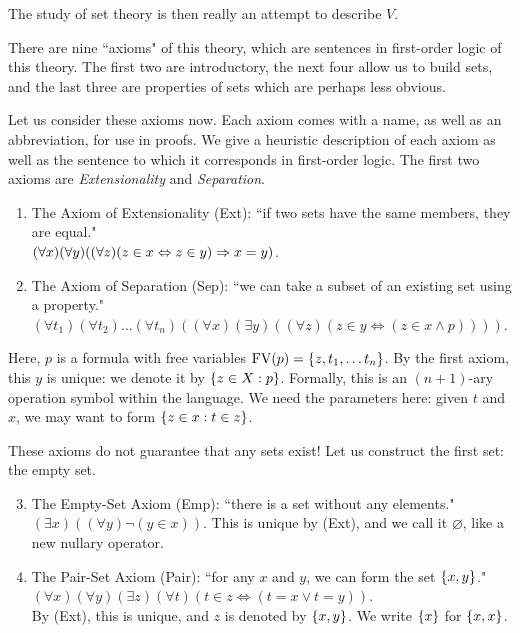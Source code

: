 \documentclass{article}
\begin{document}
The study of set theory is then really an attempt to describe $V$.

There are nine ``axioms" of this theory, which are sentences in first-order logic of this theory. The first two are introductory, the next four allow us to build sets, and the last three are properties of sets which are perhaps less obvious.

Let us consider these axioms now. Each axiom comes with a name, as well as an abbreviation, for use in proofs. We give a heuristic description of each axiom as well as the sentence to which it corresponds in first-order logic. The first two axioms are \textit{Extensionality} and \textit{Separation}.

\begin{enumerate}
    \item The Axiom of Extensionality (Ext): ``if two sets have the same members, they are equal." \\
    $(\forall x)(\forall y)((\forall z)(z \in x \Leftrightarrow z \in y) \Rightarrow x = y)$.
    \item The Axiom of Separation (Sep): ``we can take a subset of an existing set using a property." \\
    $(\forall t_1)(\forall t_2) \dots (\forall t_n)((\forall x)(\exists y)((\forall z)(z \in y \Leftrightarrow (z \in x \land p))))$.
\end{enumerate}

\begin{note}
	Here, $p$ is a formula with free variables $\mathrm{FV}(p) = \left\lbrace z, t_1, \dots t_n \right\rbrace$. By the first axiom, this $y$ is unique: we denote it by $\left\lbrace z \in X : p \right\rbrace$. Formally, this is an $(n+1)$-ary operation symbol within the language. We need the parameters here: given $t$ and $x$, we may want to form $\left\lbrace z \in x: t \in z \right\rbrace$.
\end{note}

These axioms do not guarantee that any sets exist! Let us construct the first set: the empty set.

\begin{enumerate}
	\setcounter{enumi}{2}
    \item The Empty-Set Axiom (Emp): ``there is a set without any elements." \\
    $(\exists x)((\forall y)\lnot(y \in x))$. This is unique by (Ext), and we call it $\varnothing$, like a new nullary operator.
    \item The Pair-Set Axiom (Pair): ``for any $x$ and $y$, we can form the set $\left\lbrace x, y \right\rbrace$." \\
    $(\forall x)(\forall y)(\exists z)(\forall t) (t \in z \Leftrightarrow (t = x \lor t = y))$. \\
    By (Ext), this is unique, and $z$ is denoted by $\left\lbrace x, y \right\rbrace$. We write $\left\lbrace x \right\rbrace$ for $\left\lbrace x, x \right\rbrace$.
\end{enumerate}
\end{document}

